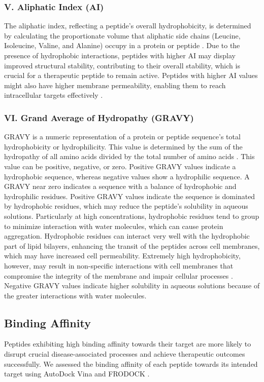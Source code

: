\subsubsection*{V. Aliphatic Index (AI)}
The aliphatic index, reflecting a peptide's overall hydrophobicity, is determined by calculating the proportionate volume that aliphatic side chains (Leucine, Isoleucine, Valine, and Alanine) occupy in a protein or peptide \cite{panda2012physicochemical}. Due to the presence of hydrophobic interactions, peptides with higher AI may display improved structural stability, contributing to their overall stability, which is crucial for a therapeutic peptide to remain active. Peptides with higher AI values might also have higher membrane permeability, enabling them to reach intracellular targets effectively \cite{panda2012physicochemical}.

\subsubsection*{VI. Grand Average of Hydropathy (GRAVY)}
GRAVY is a numeric representation of a protein or peptide sequence's total hydrophobicity or hydrophilicity. This value is determined by the sum of the hydropathy of all amino acids divided by the total number of amino acids \cite{kyte1982simple}. This value can be positive, negative, or zero. Positive GRAVY values indicate a hydrophobic sequence, whereas negative values show a hydrophilic sequence. A GRAVY near zero indicates a sequence with a balance of hydrophobic and hydrophilic residues. Positive GRAVY values indicate the sequence is dominated by hydrophobic residues, which may reduce the peptide's solubility in aqueous solutions. Particularly at high concentrations, hydrophobic residues tend to group to minimize interaction with water molecules, which can cause protein aggregation. Hydrophobic residues can interact very well with the hydrophobic part of lipid bilayers, enhancing the transit of the peptides across cell membranes, which may have increased cell permeability. Extremely high hydrophobicity, however, may result in non-specific interactions with cell membranes that compromise the integrity of the membrane and impair cellular processes \cite{kyte1982simple}. Negative GRAVY values indicate higher solubility in aqueous solutions because of the greater interactions with water molecules.

\subsection{Binding Affinity}
Peptides exhibiting high binding affinity towards their target are more likely to disrupt crucial disease-associated processes and achieve therapeutic outcomes successfully. We assessed the binding affinity of each peptide towards its intended target using AutoDock Vina \cite{trott2010autodock} and FRODOCK \cite{Aportela2016}.

